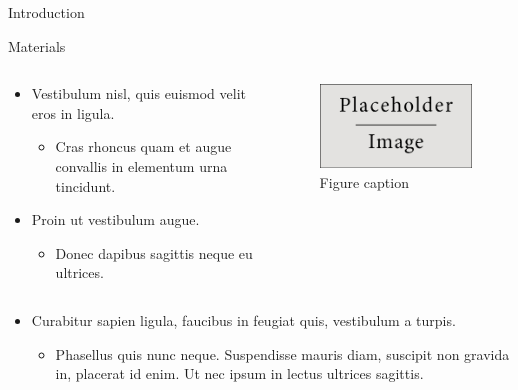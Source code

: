 \documentclass[final,hyperref={pdfpagelabels=false}]{beamer}
\begin{document}
\begin{frame}[t]
\begin{columns}[t]
\begin{column}{.465\textwidth}
\begin{ctblock}{Introduction}
\end{ctblock}


\begin{gtblock}{Materials}

\begin{columns} %
\begin{column}{.54\textwidth} %
\begin{itemize}
\item Vestibulum nisl, quis euismod velit eros in ligula.
\begin{itemize}
\item Cras rhoncus quam et augue convallis in elementum urna tincidunt.
\end{itemize}
\item Proin ut vestibulum augue.
\begin{itemize}
\item Donec dapibus sagittis neque eu ultrices.
\end{itemize}
\end{itemize}
\end{column}

\begin{column}{.43\textwidth} %
\centering
\begin{figure}
\includegraphics[width=0.8\linewidth]{placeholder.jpg}
\caption{Figure caption}
\end{figure}
\end{column}
\end{columns} %

\begin{itemize}
\item Curabitur sapien ligula, faucibus in feugiat quis, vestibulum a turpis.
\begin{itemize}
\item Phasellus quis nunc neque. Suspendisse mauris diam, suscipit non gravida in, placerat id enim. Ut nec ipsum in lectus ultrices sagittis.
\end{itemize}
\end{itemize}


\end{gtblock}
\end{column}
\end{columns}
\end{frame}
\end{document}
